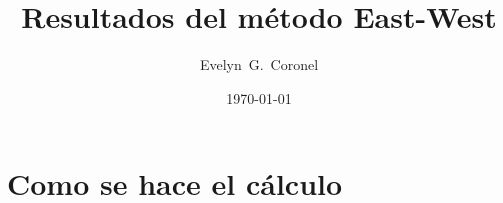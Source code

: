 



\title{Resultados del método East-West}
\author{Evelyn~G.~Coronel}


\date[]{\lowercase{\today}} %


\maketitle

\section*{Como se hace el cálculo}

